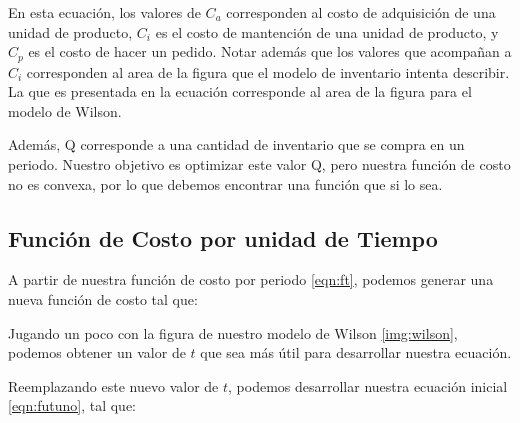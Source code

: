 En esta ecuación, los valores de $C_a$ corresponden al costo de adquisición de una unidad de producto, $C_i$ es el costo de mantención de una unidad de producto, y $C_p$ es el costo de hacer un pedido. Notar además que los valores que acompañan a $C_i$ corresponden al area de la figura que el modelo de inventario intenta describir. La que es presentada en la ecuación  corresponde al area de la figura para el modelo de Wilson.

Además, Q corresponde a una cantidad de inventario que se compra en un periodo. Nuestro objetivo es optimizar este valor Q, pero nuestra función de costo no es convexa, por lo que debemos encontrar una función que si lo sea.

\clearpage

\subsection{Función de Costo por unidad de Tiempo}

A partir de nuestra función de costo por periodo \ref{eqn:ft}, podemos generar una nueva función de costo tal que:


Jugando un poco con la figura de nuestro modelo de Wilson \ref{img:wilson}, podemos obtener un valor de $t$ que sea más útil para desarrollar nuestra ecuación.


Reemplazando este nuevo valor de $t$, podemos desarrollar nuestra ecuación inicial \ref{eqn:futuno}, tal que:


